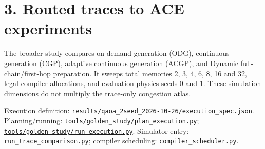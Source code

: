 \documentclass[10pt,a4paper]{article}
\begin{document}
\section*{3. Routed traces to ACE experiments}
The broader study compares on-demand generation (ODG), continuous generation (CGP), adaptive continuous generation (ACGP), and Dynamic full-chain/first-hop preparation. It sweeps total memories 2, 3, 4, 6, 8, 16 and 32, legal compiler allocations, and evaluation physics seeds 0 and 1. These simulation dimensions do not multiply the trace-only congestion atlas.\par
Execution definition: \href{\detokenize{file:///home/dhruv-pansuriya/Documents/BTP/Compiler-Driven-ACE/results/qaoa_2seed_2026-10-26/execution_spec.json}}{\nolinkurl{results/qaoa_2seed_2026-10-26/execution_spec.json}}. Planning/running: \href{\detokenize{file:///home/dhruv-pansuriya/Documents/BTP/Compiler-Driven-ACE/tools/golden_study/plan_execution.py}}{\nolinkurl{tools/golden_study/plan_execution.py}}; \href{\detokenize{file:///home/dhruv-pansuriya/Documents/BTP/Compiler-Driven-ACE/tools/golden_study/run_execution.py}}{\nolinkurl{tools/golden_study/run_execution.py}}. Simulator entry: \href{\detokenize{file:///home/dhruv-pansuriya/Documents/BTP/Compiler-Driven-ACE/run_trace_comparison.py}}{\nolinkurl{run_trace_comparison.py}}; compiler scheduling: \href{\detokenize{file:///home/dhruv-pansuriya/Documents/BTP/Compiler-Driven-ACE/compiler_scheduler.py}}{\nolinkurl{compiler_scheduler.py}}.\par
\clearpage
\end{document}
